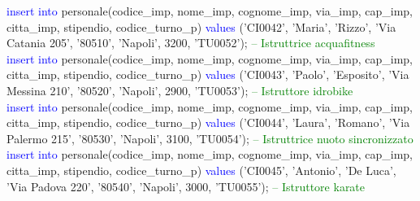 \documentclass{article}
\begin{document}
\begin{flushleft}
{        \vspace{2mm}
        \hspace*{0.5em}\textcolor{blue}{insert into} personale(codice\_imp, nome\_imp, cognome\_imp, via\_imp, cap\_imp, \hspace*{0.5em}citta\_imp, stipendio, codice\_turno\_p) \textcolor{blue}{values} ('CI0042', 'Maria', 'Rizzo', 'Via \hspace*{0.5em}Catania 205', \hspace*{0.5em}'80510', 'Napoli', 3200, 'TU0052'); \hspace*{0.5em} \textcolor{green}{-- Istruttrice acquafitness} \\
        \newpage
        \hspace*{0.5em}\textcolor{blue}{insert into} personale(codice\_imp, nome\_imp, cognome\_imp, via\_imp, cap\_imp, \hspace*{0.5em}citta\_imp, stipendio, codice\_turno\_p) \textcolor{blue}{values} ('CI0043', 'Paolo', 'Esposito', 'Via \hspace*{0.5em}Messina 210', \hspace*{0.5em}'80520', 'Napoli', 2900, 'TU0053'); \hspace*{0.5em} \textcolor{green}{-- Istruttore idrobike} \\
        \vspace{2mm}
        \hspace*{0.5em}\textcolor{blue}{insert into} personale(codice\_imp, nome\_imp, cognome\_imp, via\_imp, cap\_imp, \hspace*{0.5em}citta\_imp, stipendio, codice\_turno\_p) \textcolor{blue}{values} ('CI0044', 'Laura', 'Romano', 'Via \hspace*{0.5em}Palermo 215', \hspace*{0.5em}'80530', 'Napoli', 3100, 'TU0054'); \hspace*{0.5em} \textcolor{green}{-- Istruttrice nuoto \hspace*{0.5em}sincronizzato} \\
        \vspace{2mm}
        \hspace*{0.5em}\textcolor{blue}{insert into} personale(codice\_imp, nome\_imp, cognome\_imp, via\_imp, cap\_imp, \hspace*{0.5em}citta\_imp, stipendio, codice\_turno\_p) \textcolor{blue}{values} ('CI0045', 'Antonio', 'De Luca', \hspace*{0.5em}'Via Padova 220', \hspace*{0.5em}'80540', 'Napoli', 3000, 'TU0055'); \hspace*{0.5em} \textcolor{green}{-- Istruttore karate} \\
}
\end{flushleft}
\end{document}
